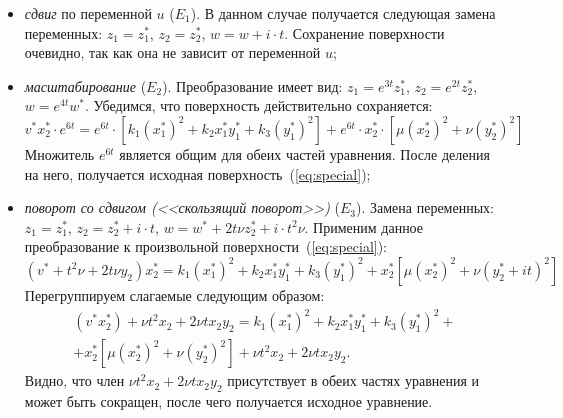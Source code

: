 \documentclass[../main.tex]{subfiles}
\begin{document}
\begin{itemize}
\item \textit{сдвиг} по переменной $u$ ($E_1$). В данном случае получается следующая замена переменных: $z_1 = z_1^*$, $z_2 = z_2^*$, $w = w + i\cdot t$. Сохранение поверхности очевидно, так как она не зависит от переменной $u$;

\item \textit{масштабирование} ($E_2$). Преобразование имеет вид: $z_1 = e^{3t} z_1^*$, $z_2 = e^{2t} z_2^*$, $w = e^{4t} w^*$. Убедимся, что поверхность действительно сохраняется:
\begin{equation*}
v^* x_2^* \cdot e^{6t} = e^{6t} \cdot\left[k_1 (x_1^*)^2 + k_2 x_1^* y_1^* + k_3 (y_1^*)^2\right] + e^{6t}\cdot x_2^* \cdot\left[\mu (x_2^*)^2 + \nu (y_2^*)^2\right]
\end{equation*}
Множитель $e^{6t}$ является общим для обеих частей уравнения. После деления на него, получается исходная поверхность~(\ref{eq:special});

\item \textit{поворот со сдвигом (<<скользящий поворот>>)} ($E_3$). Замена переменных: $z_1 = z_1^*$, $z_2 = z_2^* + i\cdot t$, $w = w^* + 2t\nu z_2^* + i\cdot t^2 \nu$. Применим данное преобразование к произвольной поверхности~(\ref{eq:special}):
\begin{equation*}
\left(v^* + t^2 \nu + 2 t \nu y_2\right) x_2^* = k_1 (x_1^*)^2 + k_2 x_1^* y_1^* + k_3 (y_1^*)^2 + x_2^* \left[\mu (x_2^*)^2 + \nu \left(y_2^* + i t\right)^2\right]
\end{equation*}
Перегруппируем слагаемые следующим образом:
\begin{multline*}
\left(v^* x_2^*\right) + \nu t^2 x_2 + 2\nu t x_2 y_2 = k_1 (x_1^*)^2 + k_2 x_1^* y_1^* + k_3 (y_1^*)^2 + \\
+ x_2^* \left[\mu (x_2^*)^2 + \nu \left(y_2^*\right)^2\right] + \nu t^2 x_2 + 2\nu t x_2 y_2.
\end{multline*}
Видно, что член $\nu t^2 x_2 + 2\nu t x_2 y_2$ присутствует в обеих частях уравнения и может быть сокращен, после чего получается исходное уравнение.
\end{itemize}
\end{document}
